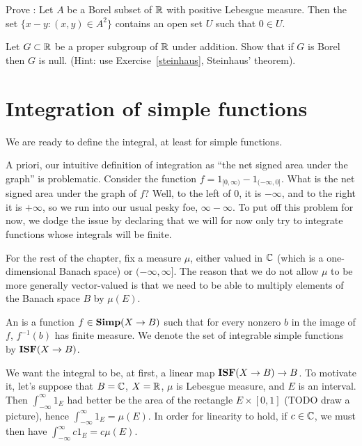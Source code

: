 \begin{exercise}
\label{steinhaus}
Prove : Let $A$ be a Borel subset of $\mathbb{R}$ with positive Lebesgue measure. Then the set $\{x - y: (x, y) \in A^2\}$ contains an open set $U$ such that $0 \in U$.
\end{exercise}

\begin{exercise}
Let $G \subset \mathbb{R}$ be a proper subgroup of $\mathbb{R}$ under addition.
Show that if $G$ is Borel then $G$ is null.
(Hint: use Exercise~\ref{steinhaus}, Steinhaus' theorem).
\end{exercise}


\section{Integration of simple functions}
We are ready to define the integral, at least for simple functions.

\begin{subsec}
A priori, our intuitive definition of integration as ``the net signed area under the graph'' is problematic.
Consider the function $f = 1_{[0, \infty)} - 1_{(-\infty, 0]}$. What is the net signed area under the graph of $f$? Well, to the left of $0$, it is $-\infty$, and to the right it is $+\infty$, so we run into our usual pesky foe, $\infty - \infty$.
To put off this problem for now, we dodge the issue by declaring that we will for now only try to integrate functions whose integrals will be finite.
\end{subsec}

\begin{subsec}
For the rest of the chapter, fix a measure $\mu$, either valued in $\mathbb{C}$ (which is a one-dimensional Banach space) or $(-\infty, \infty]$.
The reason that we do not allow $\mu$ to be more generally vector-valued is that we need to be able to multiply elements of the Banach space $B$ by $\mu(E)$.
\end{subsec}

\begin{definition}
An  is a function $f \in \mathbf{Simp}(X \to B)$ such that for every nonzero $b$ in the image of $f$, $f^{-1}(b)$ has finite measure.
We denote the set of integrable simple functions by $\mathbf{ISF}(X \to B)$.
\end{definition}

\begin{subsec}
We want the integral to be, at first, a linear map $\mathbf{ISF}(X \to B) \to B$.
To motivate it, let's suppose that $B = \mathbb{C}$, $X = \mathbb{R}$, $\mu$ is Lebesgue measure, and $E$ is an interval. Then $\int_{-\infty}^{\infty} 1_E$ had better be the area of the rectangle $E \times [0, 1]$ (TODO draw a picture), hence $\int_{-\infty}^{\infty} 1_{E} = \mu(E)$. In order for linearity to hold, if $c \in \mathbb{C}$, we must then have $\int_{-\infty}^{\infty} c1_{E} = c\mu(E)$.
\end{subsec}

